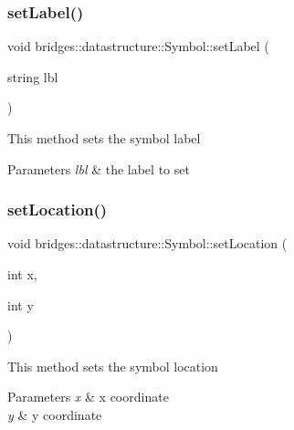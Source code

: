 \subsubsection{\texorpdfstring{set\+Label()}{setLabel()}}
{\footnotesize\ttfamily void bridges\+::datastructure\+::\+Symbol\+::set\+Label (\begin{DoxyParamCaption}\item[{string}]{lbl }\end{DoxyParamCaption})\hspace{0.3cm}{\ttfamily [inline]}}

This method sets the symbol label


\begin{DoxyParams}{Parameters}
{\em lbl} & the label to set \\
\hline
\end{DoxyParams}
\mbox{\label{classbridges_1_1datastructure_1_1_symbol_a9c62675b598fc5e755721576852f2dcf}} 
\subsubsection{\texorpdfstring{set\+Location()}{setLocation()}\hspace{0.1cm}{\footnotesize\ttfamily [1/2]}}
{\footnotesize\ttfamily void bridges\+::datastructure\+::\+Symbol\+::set\+Location (\begin{DoxyParamCaption}\item[{int}]{x,  }\item[{int}]{y }\end{DoxyParamCaption})\hspace{0.3cm}{\ttfamily [inline]}}

This method sets the symbol location


\begin{DoxyParams}{Parameters}
{\em x} & x coordinate \\
\hline
{\em y} & y coordinate \\
\hline
\end{DoxyParams}
\mbox{\label{classbridges_1_1datastructure_1_1_symbol_a4dbf51dac8b22b293a7061f5eb84b460}} 
